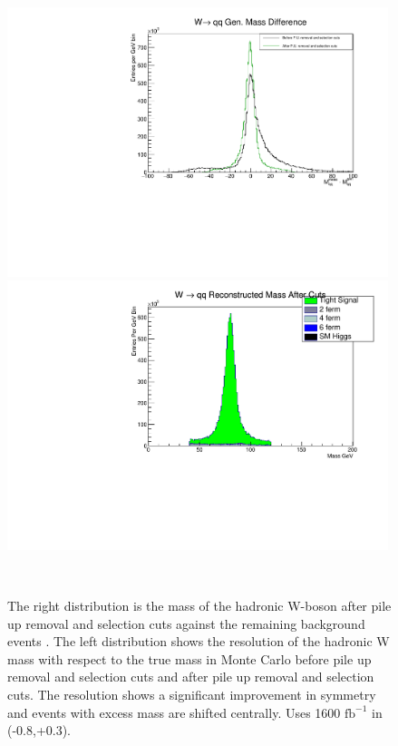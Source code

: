 \begin{figure}
\label{fig:money}
\centering
    \begin{minipage}{0.49\textwidth}
        \centering
        \includegraphics[width=0.99\textwidth]{moneymassdiff.pdf} %
   
    \end{minipage}\hfill
    \begin{minipage}{0.49\textwidth}
        \centering
        \includegraphics[width=0.99\textwidth]{mwhadCutsHist.pdf} %
     
     \end{minipage}\\
     \caption{The right distribution is the mass of the hadronic W-boson after pile up removal and selection cuts against the remaining background events . The left distribution shows the resolution of the hadronic W mass with respect to the true mass in Monte Carlo before pile up removal and selection cuts and after pile up removal and selection cuts. The resolution shows a significant improvement in symmetry and events with excess mass are shifted centrally.  Uses 1600 $\text{fb}^{-1}$ in (-0.8,+0.3). 
}
\end{figure}

